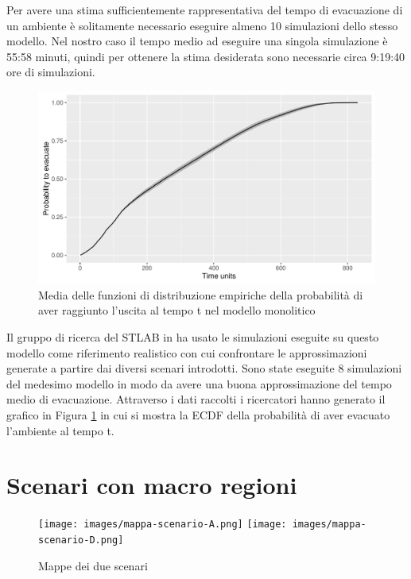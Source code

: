 Per avere una stima sufficientemente rappresentativa del tempo di evacuazione di un ambiente è solitamente necessario eseguire almeno 10 simulazioni dello stesso modello. Nel nostro caso il tempo medio ad eseguire una singola simulazione è 55:58 minuti, quindi per ottenere la stima desiderata sono necessarie circa 9:19:40 ore di simulazioni.

\begin{figure}[htbp]
\centering
\includegraphics[width=\textwidth,height=\textheight,keepaspectratio]{images/meancdf.pdf}
\caption{Media delle funzioni di distribuzione empiriche della probabilità di aver raggiunto l'uscita al tempo t nel modello monolitico}
\label{fig:ecdf}
\end{figure}

Il gruppo di ricerca del STLAB in \cite{esperimenti-sandro} ha usato le simulazioni eseguite su questo modello come riferimento realistico con cui confrontare le approssimazioni generate a partire dai diversi scenari introdotti. Sono state eseguite 8 simulazioni del medesimo modello in modo da avere una buona approssimazione del tempo medio di evacuazione. Attraverso i dati raccolti i ricercatori hanno generato il grafico in Figura \ref{fig:ecdf} in cui si mostra la ECDF della probabilità di aver evacuato l'ambiente al tempo t.

\section{Scenari con macro regioni}

\begin{figure}[htbp]
\centering
\texttt{[image: images/mappa-scenario-A.png]}
\texttt{[image: images/mappa-scenario-D.png]}
\caption{Mappe dei due scenari}
\label{fig:immagine-mappa-completo}
\end{figure}


